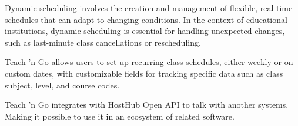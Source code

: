 Dynamic scheduling involves the creation and management of flexible, real-time schedules that can adapt to changing conditions. In the context of educational institutions, dynamic scheduling is essential for handling unexpected changes, such as last-minute class cancellations or rescheduling.

Teach 'n Go allows users to set up recurring class schedules, either weekly or on custom dates, with customizable fields for tracking specific data such as class subject, level, and course codes.

Teach 'n Go integrates with HostHub Open API to talk with another systems. Making it possible to use it in an ecosystem of related software.


%
